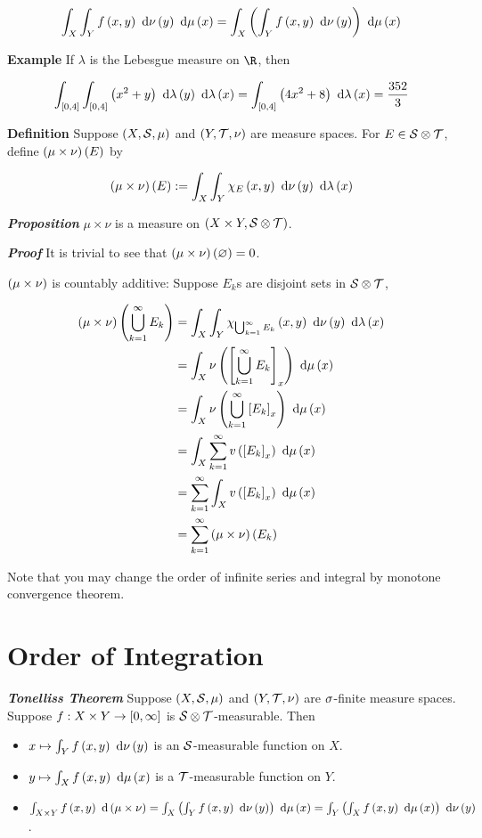 \documentclass[
]{article}
\begin{document}
\[\int_X\int_Yf\pr{x,y}\d \nu\pr{y}\dm\pr{x} = \int_X\pr{\int_Yf\pr{x,y}\d\nu\pr{y}}\dm\pr{x}\]

\textbf{Example} If \(\lambda\) is the Lebesgue measure on \(\R\), then

\[\int_{\br{0,4}}\int_{\br{0,4}}\pr{x^2+y}\dl\pr{y}\dl\pr{x}  = \int_{\br{0,4}}\pr{4x^2+8}\dl\pr{x} = \frac{352}3\]

\textbf{Definition} Suppose \(\pr{X,\S,\mu}\) and \(\pr{Y,\T,\nu}\) are
measure spaces. For \(E\in \S\otimes \T\), define
\(\pr{\mu\times \nu}\pr{E}\) by

\[\pr{\mu\times \nu}\pr{E}:= \int_X\int_Y\chi_E\pr{x,y}\d \nu\pr{y}\dl\pr{x}\]

\emph{\textbf{Proposition}} \(\mu\times \nu\) is a measure on
\(\pr{X\times Y,\S\otimes \T}\).

\emph{\textbf{Proof}} It is trivial to see that
\(\pr{\mu\times \nu}\pr{\empty} = 0\).

\(\pr{\mu\times \nu}\) is countably additive: Suppose
\(E_k\)\textquotesingle s are disjoint sets in \(\S\otimes \T\),

\[\ba
\pr{\mu\times \nu}\pr{\uinf E_k} & = \int_X\int_Y\chi_{\uinf E_k}\pr{x,y}\d \nu\pr{y}\dl\pr{x}\\
& = \int_X \nu\pr{\br{\uinf E_k}_x}\dm\pr{x}\\
& = \int_X \nu\pr{\uinf \br{E_k}_x}\dm\pr{x}\\
& = \int_X\sinf v\pr{\br{E_k}_x}\dm\pr{x}\\
& = \sinf \int_X v\pr{\br{E_k}_x}\dm\pr{x}\\
& = \sinf \pr{\mu\times \nu}\pr{E_k}
\ea\]

Note that you may change the order of infinite series and integral by
monotone convergence theorem.

\hypertarget{order-of-integration}{%
\section{Order of Integration}\label{order-of-integration}}

\emph{\textbf{Tonellis\textquotesingle s Theorem}} Suppose
\(\pr{X,\S,\mu}\) and \(\pr{Y,\T,\nu}\) are \(\s\)-finite measure
spaces. Suppose \(f:X\times Y\to \br{0,\infty}\) is
\(\S\otimes \T\)-measurable. Then

\begin{itemize}
\item
  \(x\mapsto \int_Yf\pr{x,y}\d\nu\pr{y}\) is an \(\S\)-measurable
  function on \(X\).
\item
  \(y\mapsto \int_Xf\pr{x,y}\dm\pr{x}\) is a \(\T\)-measurable function
  on \(Y\).
\item
  \(\int_{X\times Y}f\pr{x,y}\d\pr{\mu\times \nu} = \int_X\pr{\int_Yf\pr{x,y}\dn\pr{y}}\dm\pr{x} = \int_Y\pr{\int_X f\pr{x,y}\dm\pr{x}}\dn\pr{y}\).
\end{itemize}
\end{document}

